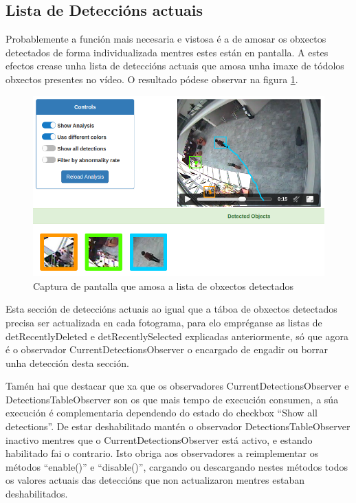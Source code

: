     \subsection{Lista de Deteccións actuais}

        Probablemente a función mais necesaria e vistosa é a de amosar os obxectos detectados de forma 
        individualizada mentres estes están en pantalla. A estes efectos crease unha lista de deteccións
        actuais que amosa unha imaxe de tódolos obxectos presentes no vídeo. O resultado pódese observar
        na figura \ref{fig:detectedObjects}.
        
        \begin{figure}[htp]
        \begin{center}
            \includegraphics[scale=0.4]{figures/detectedObjects.png}
            \caption{Captura de pantalla que amosa a lista de obxectos detectados}
        \label{fig:detectedObjects}
        \end{center}
        \end{figure}
    
        Esta sección de deteccións actuais ao igual que a táboa de obxectos detectados precisa ser 
        actualizada en cada fotograma, para elo empréganse as listas de detRecentlyDeleted e 
        detRecentlySelected explicadas anteriormente, só que agora é o observador 
        CurrentDetectionsObserver o encargado de engadir ou borrar unha detección desta sección.
        
        Tamén hai que destacar que xa que os observadores CurrentDetectionsObserver e 
        DetectionsTableObserver son os que mais tempo de execución consumen, a súa execución é 
        complementaria dependendo do estado do checkbox ``Show all detections''. De estar
        deshabilitado mantén o observador DetectionsTableObserver inactivo mentres que o 
        CurrentDetectionsObserver está activo, e estando habilitado fai o contrario. Isto obriga aos
        observadores a reimplementar os métodos ``enable()'' e ``disable()'', cargando ou
        descargando nestes métodos todos os valores actuais das deteccións que non actualizaron mentres
        estaban deshabilitados.
        
